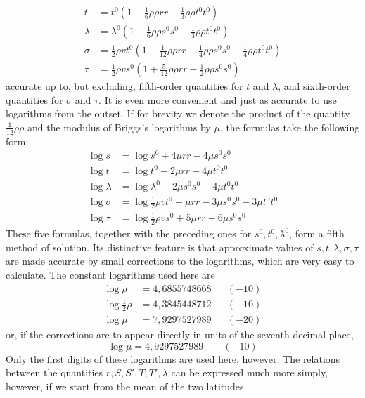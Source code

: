 %
\[
\begin{aligned}
t&=t^0(1-\tfrac{1}{6}\rho\rho rr-\tfrac{1}{3}\rho\rho t^0t^0)\\
\lambda&=\lambda^0(1-\tfrac{1}{6}\rho\rho s^0s^0-\tfrac{1}{3}\rho\rho t^0t^0)\\
\sigma&=\tfrac{1}{2}\rho vt^0(1-\tfrac{1}{12}\rho\rho rr-\tfrac{1}{4}\rho\rho s^0s^0-\tfrac{1}{4}\rho\rho t^0t^0)\\
\tau&=\tfrac{1}{2}\rho vs^0(1+\tfrac{5}{12}\rho\rho rr-\tfrac{1}{2}\rho\rho s^0s^0)
\end{aligned}
\]
accurate up to, but excluding, fifth-order quantities for \(t\) and \(\lambda\), and sixth-order quantities for \(\sigma\) and \(\tau\). It is even more convenient and just as accurate to use logarithms from the outset. If for brevity we denote the product of the quantity \(\tfrac{1}{12}\rho\rho\) and the modulus of Briggs's logarithms by \(\mu\), the formulas take the following form:
\[
\begin{aligned}
\log s&=\log s^0+4\mu rr-4\mu s^0s^0\\
\log t&=\log t^0-2\mu rr-4\mu t^0t^0\\
\log\lambda&=\log\lambda^0-2\mu s^0s^0-4\mu t^0t^0\\
\log\sigma&=\log\tfrac{1}{2}\rho vt^0-\mu rr-3\mu s^0s^0-3\mu t^0t^0\\
\log\tau&=\log\tfrac{1}{2}\rho vs^0+5\mu rr-6\mu s^0s^0
\end{aligned}
\]
\indent These five formulas, together with the preceding ones for \(s^0,t^0,\lambda^0\), form a fifth method of solution. Its distinctive feature is that approximate values of \(s,t,\lambda,\sigma,\tau\) are made accurate by small corrections to the logarithms, which are very easy to calculate. The constant logarithms used here are
\[
\begin{aligned}
\log\rho&=4{,}6855748668&&(-10)\\
\log\tfrac{1}{2}\rho&=4{,}3845448712&&(-10)\\
\log\mu&=7{,}9297527989&&(-20)
\end{aligned}
\]
or, if the corrections are to appear directly in units of the seventh decimal place,
\[
\log\mu=4{,}9297527989\qquad(-10)
\]
Only the first digits of these logarithms are used here, however.
The relations between the quantities \(r,S,S',T,T',\lambda\) can be expressed much more simply, however, if we start from the mean of the two latitudes
